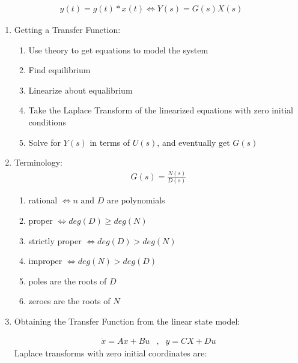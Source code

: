 \begin{enumerate}
        \begin{align*} y(t) = g(t) * x(t) \Leftrightarrow Y(s) = G(s)X(s)\end{align*}

        \begin{enumerate}
            \item Getting a Transfer Function:

            \begin{enumerate}
                \item Use theory to get equations to model the system
                \item Find equilibrium
                \item Linearize about equalibrium
                \item Take the Laplace Transform of the linearized equations with zero initial conditions
                \item Solve for $Y(s)$ in terms of $U(s)$, and eventually get $G(s)$
            \end{enumerate}

            \item Terminology:
                \begin{align*} G(s) = \frac{N(s)}{D(s)} \end{align*}

                \begin{enumerate}
                    \item rational $\iff n \text{ and } D$ are polynomials
                    \item proper $\iff deg(D) \ge deg(N)$
                    \item strictly proper $\iff deg(D) > deg(N)$
                    \item improper $\iff deg(N) > deg(D)$
                    \item poles are the roots of $D$
                    \item zeroes are the roots of $N$
                \end{enumerate}

            \item Obtaining the Transfer Function from the linear state model:

                \begin{align*}
                    \dot x = Ax + Bu &,& y = CX + Du
                \end{align*}
                Laplace transforms with zero initial coordinates are:


\end{enumerate}
\end{enumerate}
